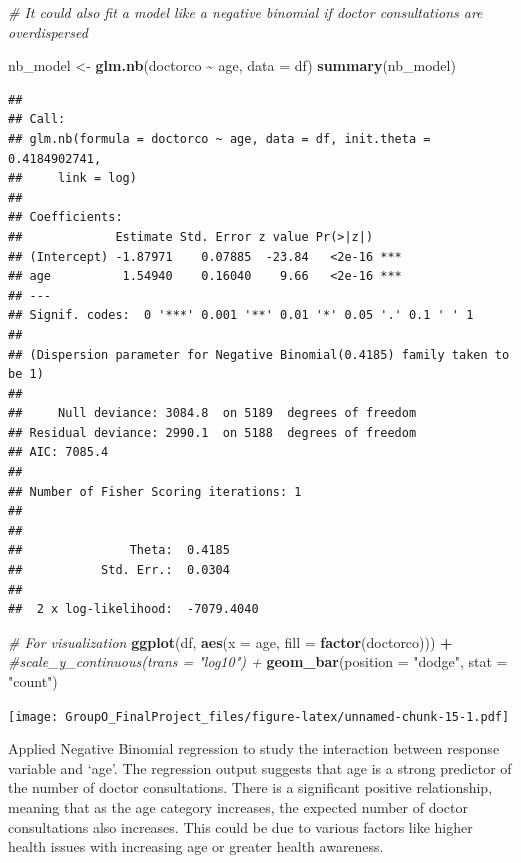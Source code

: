 \documentclass[
]{article}
\newenvironment{Shaded}{\begin{snugshade}}{\end{snugshade}}
\newcommand{\AttributeTok}[1]{\textcolor[rgb]{0.13,0.29,0.53}{#1}}
\newcommand{\CommentTok}[1]{\textcolor[rgb]{0.56,0.35,0.01}{\textit{#1}}}
\newcommand{\FunctionTok}[1]{\textcolor[rgb]{0.13,0.29,0.53}{\textbf{#1}}}
\newcommand{\NormalTok}[1]{#1}
\newcommand{\OtherTok}[1]{\textcolor[rgb]{0.56,0.35,0.01}{#1}}
\newcommand{\SpecialCharTok}[1]{\textcolor[rgb]{0.81,0.36,0.00}{\textbf{#1}}}
\newcommand{\StringTok}[1]{\textcolor[rgb]{0.31,0.60,0.02}{#1}}
\begin{document}
\begin{Shaded}
\begin{Highlighting}[]
\CommentTok{\# It could also fit a model like a negative binomial if doctor consultations are overdispersed}

\NormalTok{nb\_model }\OtherTok{\textless{}{-}} \FunctionTok{glm.nb}\NormalTok{(doctorco }\SpecialCharTok{\textasciitilde{}}\NormalTok{ age, }\AttributeTok{data =}\NormalTok{ df)}
\FunctionTok{summary}\NormalTok{(nb\_model)}
\end{Highlighting}
\end{Shaded}

\begin{verbatim}
## 
## Call:
## glm.nb(formula = doctorco ~ age, data = df, init.theta = 0.4184902741, 
##     link = log)
## 
## Coefficients:
##             Estimate Std. Error z value Pr(>|z|)    
## (Intercept) -1.87971    0.07885  -23.84   <2e-16 ***
## age          1.54940    0.16040    9.66   <2e-16 ***
## ---
## Signif. codes:  0 '***' 0.001 '**' 0.01 '*' 0.05 '.' 0.1 ' ' 1
## 
## (Dispersion parameter for Negative Binomial(0.4185) family taken to be 1)
## 
##     Null deviance: 3084.8  on 5189  degrees of freedom
## Residual deviance: 2990.1  on 5188  degrees of freedom
## AIC: 7085.4
## 
## Number of Fisher Scoring iterations: 1
## 
## 
##               Theta:  0.4185 
##           Std. Err.:  0.0304 
## 
##  2 x log-likelihood:  -7079.4040
\end{verbatim}

\begin{Shaded}
\begin{Highlighting}[]
\CommentTok{\# For visualization}
\FunctionTok{ggplot}\NormalTok{(df, }\FunctionTok{aes}\NormalTok{(}\AttributeTok{x =}\NormalTok{ age, }\AttributeTok{fill =} \FunctionTok{factor}\NormalTok{(doctorco))) }\SpecialCharTok{+} 
  \CommentTok{\#scale\_y\_continuous(trans = "log10") +}
  \FunctionTok{geom\_bar}\NormalTok{(}\AttributeTok{position =} \StringTok{"dodge"}\NormalTok{, }\AttributeTok{stat =} \StringTok{"count"}\NormalTok{)}
\end{Highlighting}
\end{Shaded}

\texttt{[image: GroupO\_FinalProject\_files/figure-latex/unnamed-chunk-15-1.pdf]}

Applied Negative Binomial regression to study the interaction between
response variable and `age'. The regression output suggests that age is
a strong predictor of the number of doctor consultations. There is a
significant positive relationship, meaning that as the age category
increases, the expected number of doctor consultations also increases.
This could be due to various factors like higher health issues with
increasing age or greater health awareness.
\end{document}

